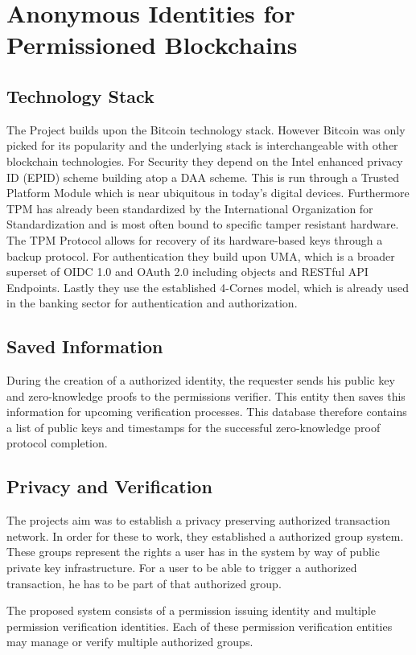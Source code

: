 \section{Anonymous Identities for Permissioned Blockchains}

\subsection{Technology Stack}
The Project builds upon the Bitcoin technology stack. However Bitcoin was only picked for its popularity and the underlying stack is interchangeable with other blockchain technologies. For Security they depend on the Intel enhanced privacy ID (EPID) scheme building atop a DAA scheme. This is run through a Trusted Platform Module which is near ubiquitous in today's digital devices. Furthermore TPM has already been standardized by the International Organization for Standardization and is most often bound to specific tamper resistant hardware. The TPM Protocol allows for recovery of its hardware-based keys through a backup protocol.
For authentication they build upon UMA, which is a broader superset of OIDC 1.0 and OAuth 2.0 including objects and RESTful API Endpoints.
Lastly they use the established 4-Cornes model, which is already used in the banking sector for authentication and authorization.

\subsection{Saved Information}
During the creation of a authorized identity, the requester sends his public key and zero-knowledge proofs to the permissions verifier. This entity then saves this information for upcoming verification processes. This database therefore contains a list of public keys and timestamps for the successful zero-knowledge proof protocol completion.

\subsection{Privacy and Verification}
The projects aim was to establish a privacy preserving authorized transaction network. In order for these to work, they established a authorized group system. These groups represent the rights a user has in the system by way of public private key infrastructure. For a user to be able to trigger a authorized transaction, he has to be part of that authorized group.

The proposed system consists of a permission issuing identity and multiple permission verification identities. Each of these permission verification entities may manage or verify multiple authorized groups.

